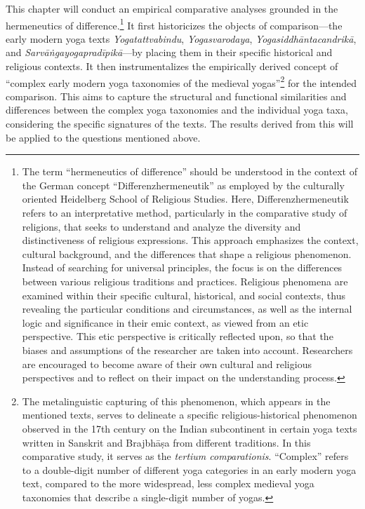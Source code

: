 This chapter will conduct an empirical comparative analyses grounded in the hermeneutics of difference.\footnote{The term ``hermeneutics of difference'' should be understood in the context of the German concept ``Differenzhermeneutik'' as employed by the culturally oriented Heidelberg School of Religious Studies. Here, Differenzhermeneutik refers to an interpretative method, particularly in the comparative study of religions, that seeks to understand and analyze the diversity and distinctiveness of religious expressions. This approach emphasizes the context, cultural background, and the differences that shape a religious phenomenon. Instead of searching for universal principles, the focus is on the differences between various religious traditions and practices. Religious phenomena are examined within their specific cultural, historical, and social contexts, thus revealing the particular conditions and circumstances, as well as the internal logic and significance in their emic context, as viewed from an etic perspective. This etic perspective is critically reflected upon, so that the biases and assumptions of the researcher are taken into account. Researchers are encouraged to become aware of their own cultural and religious perspectives and to reflect on their impact on the understanding process.} It first historicizes the objects of comparison—the early modern yoga texts \emph{Yogatattvabindu}, \emph{Yogasvarodaya}, \emph{Yogasiddhāntacandrikā}, and \emph{Sarvāṅgayogapradīpikā}—by placing them in their specific historical and religious contexts. It then instrumentalizes the empirically derived concept of ``complex early modern yoga taxonomies of the medieval yogas''\footnote{The metalinguistic capturing of this phenomenon, which appears in the mentioned texts, serves to delineate a specific religious-historical phenomenon observed in the 17th century on the Indian subcontinent in certain yoga texts written in Sanskrit and Brajbhāṣa from different traditions. In this comparative study, it serves as the \textit{tertium comparationis}. ``Complex'' refers to a double-digit number of different yoga categories in an early modern yoga text, compared to the more widespread, less complex medieval yoga taxonomies that describe a single-digit number of yogas.} for the intended comparison. This aims to capture the structural and functional similarities and differences between the complex yoga taxonomies and the individual yoga taxa, considering the specific signatures of the texts. The results derived from this will be applied to the questions mentioned above.


